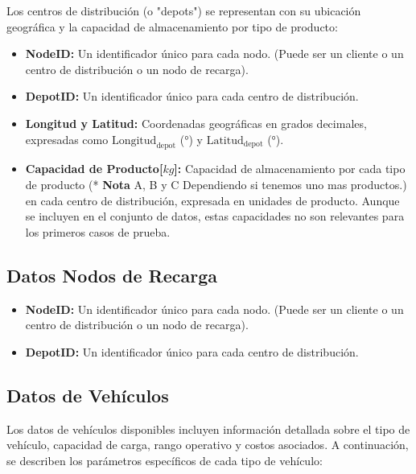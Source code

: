 \documentclass[12pt]{article}
\begin{document}
Los centros de distribución (o "depots") se representan con su ubicación geográfica y la capacidad de almacenamiento por tipo de producto:
\begin{itemize}
    \item \textbf{NodeID:} Un identificador único para cada nodo. (Puede ser un cliente o un centro de distribución o un nodo de recarga).
    \item \textbf{DepotID:} Un identificador único para cada centro de distribución.
    \item \textbf{Longitud y Latitud:} Coordenadas geográficas en grados decimales, expresadas como $\text{Longitud}_{\text{depot}}$ (°) y $\text{Latitud}_{\text{depot}}$ (°).
    \item \textbf{Capacidad de Producto[$kg$]:} Capacidad de almacenamiento por cada tipo de producto (* \textbf{Nota} A, B y C Dependiendo si tenemos uno mas productos.) en cada centro de distribución, expresada en unidades de producto. Aunque se incluyen en el conjunto de datos, estas capacidades no son relevantes para los primeros casos de prueba.
\end{itemize}

\subsection{Datos Nodos de Recarga}
\begin{itemize}
    \item \textbf{NodeID:} Un identificador único para cada nodo. (Puede ser un cliente o un centro de distribución o un nodo de recarga).
    \item \textbf{DepotID:} Un identificador único para cada centro de distribución.
\end{itemize}

\subsection{Datos de Vehículos}

Los datos de vehículos disponibles incluyen información detallada sobre el tipo de vehículo, capacidad de carga, rango operativo y costos asociados. A continuación, se describen los parámetros específicos de cada tipo de vehículo:
\end{document}
